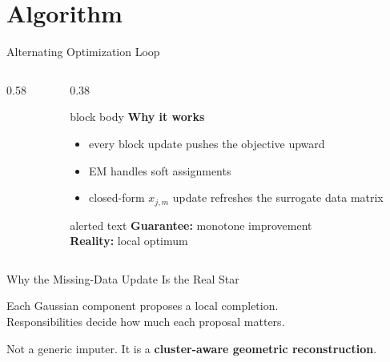 \section{Algorithm}

\begin{frame}[shrink=5]{Alternating Optimization Loop}
    \begin{columns}[T,onlytextwidth]
        \begin{column}{0.58\textwidth}
            
        \end{column}
        \begin{column}{0.38\textwidth}
            \small
            \begin{beamercolorbox}[sep=0.7em, rounded=true, shadow=true]{block body}
                \textbf{Why it works}
                \begin{itemize}
                    \item every block update pushes the objective upward
                    \item EM handles soft assignments
                    \item closed-form \(x_{j,m}\) update refreshes the surrogate data matrix
                \end{itemize}
            \end{beamercolorbox}

            \vspace{0.25cm}
            \begin{beamercolorbox}[sep=0.65em, rounded=true, shadow=true]{alerted text}
                \textbf{Guarantee:} monotone improvement\\
                \textbf{Reality:} local optimum
            \end{beamercolorbox}
        \end{column}
    \end{columns}
\end{frame}


\begin{frame}[shrink=5]{Why the Missing-Data Update Is the Real Star}
    \begin{center}
        {\large
        Each Gaussian component proposes a local completion.}\\[0.2cm]
        {\large
        Responsibilities decide how much each proposal matters.}
    \end{center}

    \vspace{0.35cm}
    

    \vspace{0.15cm}
    \begin{center}
        \large
        \textcolor{alertRed}{Not a generic imputer.}
        It is a \textbf{cluster-aware geometric reconstruction}.
    \end{center}
\end{frame}
